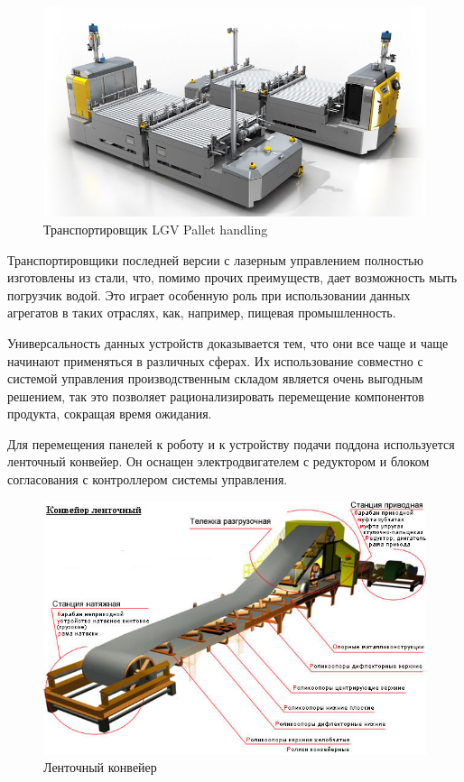 \begin{figure}[ht]
    \includegraphics[width=.7\linewidth]{Figures/lgvtrans.png}
    \caption{Транспортировщик LGV Pallet handling}
    \label{fig:lgvtrans}
\end{figure}

Транспортировщики последней версии с лазерным управлением полностью изготовлены из стали, что, помимо прочих преимуществ, дает возможность мыть погрузчик водой. Это играет особенную роль при использовании данных агрегатов в таких отраслях, как, например, пищевая промышленность.

Универсальность данных устройств доказывается тем, что они все чаще и чаще начинают применяться в различных сферах. Их использование совместно с системой управления производственным складом является очень выгодным решением, так это позволяет рационализировать перемещение компонентов продукта, сокращая время ожидания.

Для перемещения панелей к роботу и к устройству подачи поддона используется ленточный конвейер. Он оснащен электродвигателем с редуктором и блоком согласования с контроллером системы управления.

\begin{figure}[ht]
    \includegraphics[width=.9\linewidth]{Figures/lent.png}
    \caption{Ленточный конвейер}
    \label{fig:lent}
\end{figure}


